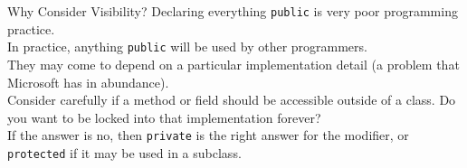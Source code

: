 \documentclass{beamer}
\begin{document}
\begin{frame}{Why Consider Visibility?}
Declaring everything \texttt{public} is very poor programming practice. \\
\vspace{0.5em}
In practice, anything \texttt{public} will be used by other programmers. \\ 
\vspace{0.5em}
They may come to depend on a particular implementation detail (a problem that Microsoft has in abundance). \\
\vspace{0.5em}
Consider carefully if a method or field should be accessible outside of a class. Do you want to be locked into that implementation forever? \\
\vspace{0.5em}
If the answer is no, then \texttt{private} is the right answer for the modifier, or \texttt{protected} if it may be used in a subclass. \\
\end{frame}
\end{document}
